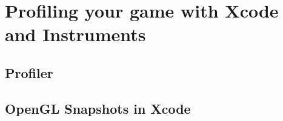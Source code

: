 \chapter{Profiling your game with Xcode and Instruments}

\section{Profiler}

\section{OpenGL Snapshots in Xcode}